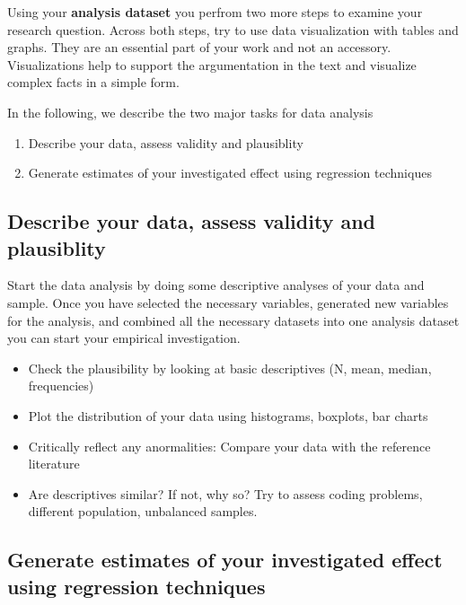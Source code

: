 \documentclass[
]{book}
\providecommand{\tightlist}{%
  \setlength{\itemsep}{0pt}\setlength{\parskip}{0pt}}
\begin{document}
Using your \textbf{analysis dataset} you perfrom two more steps to
examine your research question. Across both steps, try to use data
visualization with tables and graphs. They are an essential part of your
work and not an accessory. Visualizations help to support the
argumentation in the text and visualize complex facts in a simple form.

In the following, we describe the two major tasks for data analysis

\begin{enumerate}
\def\labelenumi{\arabic{enumi}.}
\tightlist
\item
  Describe your data, assess validity and plausiblity
\item
  Generate estimates of your investigated effect using regression
  techniques
\end{enumerate}

\hypertarget{describe-your-data-assess-validity-and-plausiblity}{%
\subsection{Describe your data, assess validity and
plausiblity}\label{describe-your-data-assess-validity-and-plausiblity}}

Start the data analysis by doing some descriptive analyses of your data
and sample. Once you have selected the necessary variables, generated
new variables for the analysis, and combined all the necessary datasets
into one analysis dataset you can start your empirical investigation.

\begin{itemize}
\tightlist
\item
  Check the plausibility by looking at basic descriptives (N, mean,
  median, frequencies)
\item
  Plot the distribution of your data using histograms, boxplots, bar
  charts
\item
  Critically reflect any anormalities: Compare your data with the
  reference literature
\item
  Are descriptives similar? If not, why so? Try to assess coding
  problems, different population, unbalanced samples.
\end{itemize}

\hypertarget{generate-estimates-of-your-investigated-effect-using-regression-techniques}{%
\subsection{Generate estimates of your investigated effect using
regression
techniques}\label{generate-estimates-of-your-investigated-effect-using-regression-techniques}}
\end{document}
